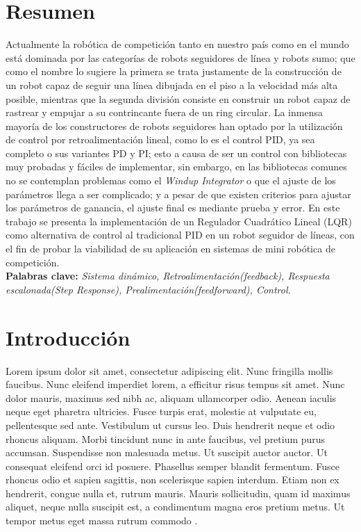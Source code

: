 \documentclass[fisica]{fcfmtesis}
\begin{document}
\chapter{Resumen}
Actualmente la robótica de competición tanto en nuestro país como en el mundo está dominada
por las categorías de robots seguidores de línea y robots sumo; que como el nombre lo sugiere
la primera se trata justamente de la construcción de un robot capaz de seguir una línea dibujada
en el piso a la velocidad más alta posible, mientras que la segunda división consiste en 
construir un robot capaz de rastrear y empujar a su contrincante fuera de un ring circular. La inmensa mayoría de los constructores de robots seguidores han optado por la utilización de control por retroalimentación lineal, como lo es el control PID, ya sea completo o sus variantes PD y PI; esto a causa de ser un control con bibliotecas muy probadas y fáciles de implementar, sin embargo, en las bibliotecas comunes no se contemplan problemas como el \emph{Windup Integrator} o que el ajuste de los parámetros llega a ser complicado; y a pesar de que existen criterios para ajustar los parámetros de ganancia, el ajuste final es mediante prueba y error. En este trabajo se presenta la implementación de un Regulador Cuadrático Lineal (LQR) como alternativa de control al tradicional PID en un robot seguidor de líneas, con el fin de probar la viabilidad de su aplicación en sistemas de mini robótica de competición.\\

\textbf{Palabras clave:} \textsl{Sistema dinámico, Retroalimentación(feedback), Respuesta escalonada(Step Response), Prealimentación(feedforward), Control.}

\chapter{Introducción}
Lorem ipsum dolor sit amet, consectetur adipiscing elit. Nunc fringilla mollis
faucibus. Nunc eleifend imperdiet lorem, a efficitur risus tempus sit amet. Nunc
dolor mauris, maximus sed nibh ac, aliquam ullamcorper odio. Aenean iaculis
neque eget pharetra ultricies. Fusce turpis erat, molestie at vulputate eu,
pellentesque sed ante. Vestibulum ut cursus leo. Duis hendrerit neque et odio
rhoncus aliquam. Morbi tincidunt nunc in ante faucibus, vel pretium purus
accumsan. Suspendisse non malesuada metus. Ut suscipit auctor auctor. Ut
consequat eleifend orci id posuere. Phasellus semper blandit fermentum. Fusce
rhoncus odio et sapien sagittis, non scelerisque sapien interdum. Etiam non ex
hendrerit, congue nulla et, rutrum mauris. Mauris sollicitudin, quam id maximus
aliquet, neque nulla suscipit est, a condimentum magna eros pretium metus. Ut
tempor metus eget massa rutrum commodo \cite{VEI}.
\end{document}
